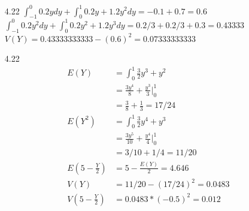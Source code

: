 \documentclass[11pt]{article}
\begin{document}
\begin{enumerate}
        \item[4.22] $\int_{-1}^0 0.2y dy + \int_0^1 0.2y+1.2y^2 dy = -0.1 + 0.7 = 0.6$ \\
                    $\int_{-1}^0 0.2y^2 dy + \int_0^1 0.2y^2+1.2y^3 dy = 0.2/3 + 0.2/3 + 0.3 = 0.43333$ \\
                    $V(Y) = 0.43333333333 - (0.6)^2 = 0.07333333333$

        \item[4.22]
        \begin{align*}
            E(Y) &= \int_0^1 \frac{3}{2}y^3 + y^2 \\
            &= \frac{3y^4}{8} + \frac{y^3}{3} |_0^1 \\
            &= \frac{3}{8} + \frac{1}{3} = 17/24 \\
            E(Y^2) &= \int_0^1 \frac{3}{2}y^4 + y^3 \\
            &= \frac{3y^5}{10} + \frac{y^4}{4} |_0^1 \\
            &= 3/10 + 1/4 = 11/20 \\
            E(5 - \frac{Y}{2}) &= 5 - \frac{E(Y)}{2} = 4.646 \\
            V(Y) &= 11/20 - (17/24)^2 = 0.0483 \\
            V(5 - \frac{Y}{2}) &= 0.0483*(-0.5)^2 = 0.012
        \end{align*}

    \end{enumerate}
\end{document}

